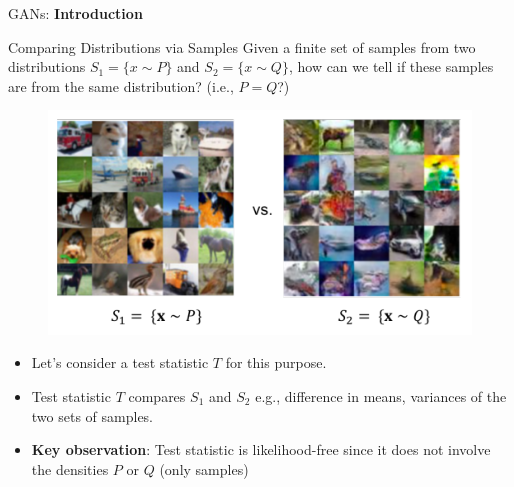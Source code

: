 \begin{frame}{}
    \LARGE GANs: \textbf{Introduction}
\end{frame}

\begin{frame}[allowframebreaks]{Comparing Distributions via Samples}
Given a finite set of samples from two distributions $S_1 = \{x \sim P\}$ and $S_2 = \{x \sim Q\}$, how can we tell if these samples are from the same distribution? (i.e., $P = Q$?)
\begin{figure}
    \centering
    \includegraphics[height=0.58\textheight, width=\textwidth, keepaspectratio]{images/gan/gan_two_dist.png}
\end{figure}

\begin{minipage}{\textwidth}
\end{minipage}

\framebreak

\begin{itemize}
    \item Let's consider a test statistic $T$ for this purpose.
    \item Test statistic $T$ compares $S_1$ and $S_2$ e.g., difference in means, variances of the two sets of samples.
    \item \textbf{Key observation}: Test statistic is likelihood-free since it does not involve the densities $P$ or $Q$ (only samples)
\end{itemize}
\end{frame}